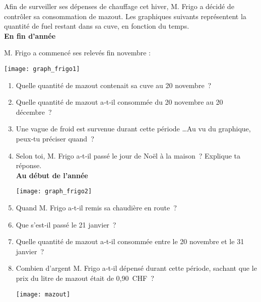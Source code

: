 \begin{exercice}[Ça chauffe !]
Afin de surveiller ses dépenses de chauffage cet hiver, M. Frigo a décidé de contrôler sa consommation de mazout. Les graphiques suivants représentent la quantité de fuel restant dans sa cuve, en fonction du temps. \\[1em]
\textbf{\textcolor{A2}{En fin d'année}}

M. Frigo a commencé ses relevés fin novembre :
\begin{center} \texttt{[image: graph\_frigo1]} \end{center}

\begin{enumerate}
 \item Quelle quantité de mazout contenait sa cuve au 20 novembre ? 
 \item Quelle quantité de mazout a‑t‑il consommée du 20 novembre au 20 décembre ?
 \item Une vague de froid est survenue durant cette période \ldots Au vu du graphique, peux‑tu préciser quand ?
 \item Selon toi, M. Frigo a‑t‑il passé le jour de Noël à la maison ? Explique ta réponse. \\[1em]
 
 \textbf{\textcolor{A2}{Au début de l'année}}
 
\begin{center} \texttt{[image: graph\_frigo2]} \end{center} 

 \item Quand M. Frigo a‑t‑il remis sa chaudière en route ?
 \item Que s'est‑il passé le 21 janvier ?
 \item Quelle quantité de mazout a‑t‑il consommée entre le 20 novembre et le 31 janvier ?
 \item Combien d'argent M. Frigo a‑t‑il dépensé durant cette période, sachant que le prix du litre de mazout était de 0,90 CHF ?
 \begin{center} \texttt{[image: mazout]} \end{center}
 \end{enumerate}
\end{exercice}



